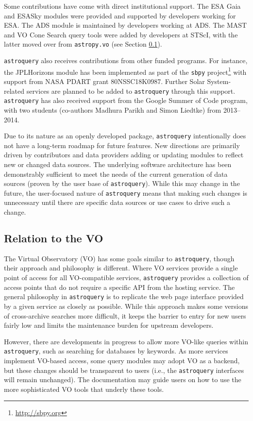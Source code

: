 \documentclass[twocolumn]{aastex62}
\newcommand{\package}[1]{\texttt{#1}\xspace}
\newcommand{\astroquery}{\package{astroquery}}
\begin{document}
Some contributions have come with direct institutional support.  The ESA Gaia and
ESASky modules were provided and supported by developers working for ESA\@.  The
ADS module is maintained by developers working at ADS. The
MAST and VO Cone Search query tools were added by developers at STScI, with the
latter moved over from \texttt{astropy.vo} (see Section \ref{sec:vo}).

\astroquery also receives contributions from other funded programs. For instance, the
JPLHorizons module has been implemented as part of the \texttt{sbpy}
project\footnote{\url{http://sbpy.org}} with support from NASA PDART grant
80NSSC18K0987. Further Solar System-related services are planned to be added to
\astroquery through this support. \astroquery has also received support from the Google Summer of Code
program, with two students (co-authors Madhura Parikh and Simon Liedtke)
from 2013--2014.

Due to its nature as an openly developed package, \astroquery intentionally
does not have a long-term roadmap for future features. New directions are primarily 
driven by contributors and data providers adding or updating modules to reflect new 
or changed data  sources. The underlying software architecture has been demonstrably
sufficient to meet the needs of the  current generation of data sources (proven by  
the user base of \astroquery).
While this may change in the future, the user-focused nature of \astroquery means
that making such changes is unnecessary until there are specific data sources or use cases
to drive such a change.


\subsection{Relation to the VO}
\label{sec:vo}

The Virtual Observatory (VO) has some goals similar to \astroquery,
though their approach and philosophy is different.  Where VO services provide a
single point of access for all VO-compatible services, \astroquery
provides a collection of access points that do not require a specific API from
the hosting service.  The general philosophy in \astroquery is to
replicate the web page interface provided by a given service as closely as
possible.  While this approach makes some versions of cross-archive searches
more difficult, it keeps the barrier to entry for new users fairly low and limits
the maintenance burden for upstream developers.

However, there are developments in progress to allow more VO-like queries
within \astroquery, such as searching for databases by keywords.  As more
services implement VO-based access, some query modules may adopt VO as a backend,
but these changes should be transparent to users (i.e., the \astroquery
interfaces will remain unchanged).  The documentation may guide users on how
to use the more sophisticated VO tools that underly these tools.
\end{document}
